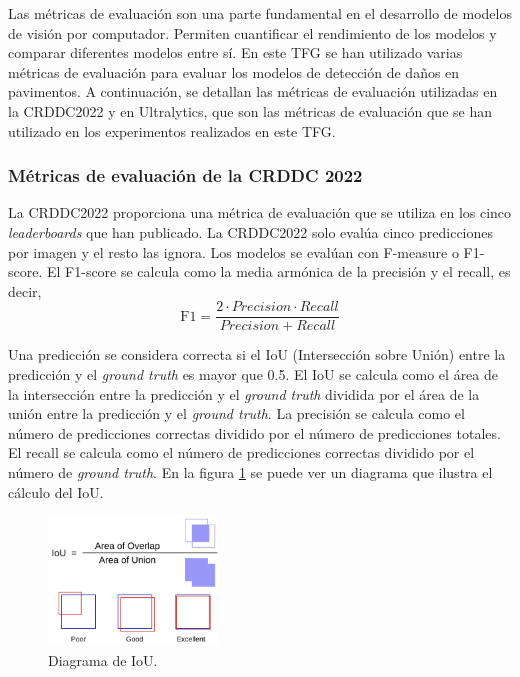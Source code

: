 
Las métricas de evaluación son una parte fundamental en el desarrollo de modelos de visión por computador. Permiten cuantificar el rendimiento de los modelos y comparar diferentes modelos entre sí. En este TFG se han utilizado varias métricas de evaluación para evaluar los modelos de detección de daños en pavimentos. A continuación, se detallan las métricas de evaluación utilizadas en la CRDDC2022 y en Ultralytics, que son las métricas de evaluación que se han utilizado en los experimentos realizados en este TFG.

\subsubsection{Métricas de evaluación de la CRDDC 2022}
La CRDDC2022 proporciona una métrica de evaluación que se utiliza en los cinco \textit{leaderboards} que han publicado. La CRDDC2022 solo evalúa cinco predicciones por imagen y el resto las ignora. Los modelos se evalúan con F-measure o F1-score. El F1-score se calcula como la media armónica de la precisión y el recall, es decir,
\begin{equation}
    \text{F1} = \frac{2 \cdot Precision \cdot Recall}{Precision + Recall}
\end{equation}

Una predicción se considera correcta si el IoU (Intersección sobre Unión) entre la predicción y el \textit{ground truth} es mayor que 0.5. El IoU se calcula como el área de la intersección entre la predicción y el \textit{ground truth} dividida por el área de la unión entre la predicción y el \textit{ground truth}. La precisión se calcula como el número de predicciones correctas dividido por el número de predicciones totales. El recall se calcula como el número de predicciones correctas dividido por el número de \textit{ground truth}. En la figura \ref{fig:IoU} se puede ver un diagrama que ilustra el cálculo del IoU.

\begin{figure}[H]
    \centering
    \includegraphics[width=0.4\textwidth]{img/IoU-diagram.png}
    \caption{Diagrama de IoU. \cite{IoU_image}}
    \label{fig:IoU}
\end{figure}


